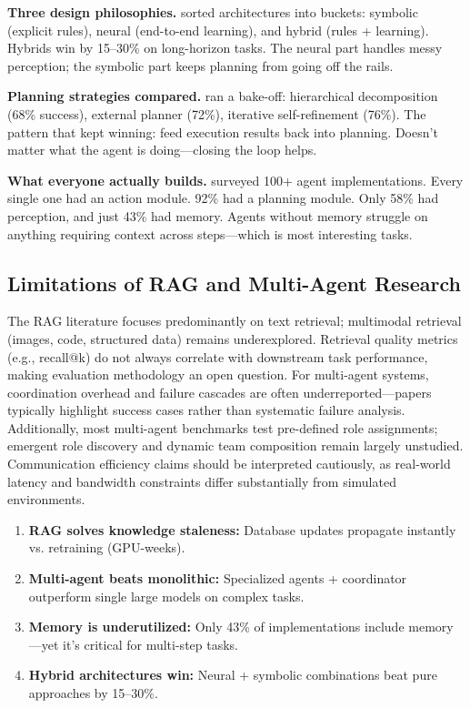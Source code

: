 \documentclass[12pt,a4paper]{report}
\theoremstyle{definition}
\begin{document}
\textbf{Three design philosophies.} \citet{sumers2023cognitive} sorted architectures into buckets: symbolic (explicit rules), neural (end-to-end learning), and hybrid (rules + learning). Hybrids win by 15--30\% on long-horizon tasks. The neural part handles messy perception; the symbolic part keeps planning from going off the rails.

\textbf{Planning strategies compared.} \citet{wang2024planning} ran a bake-off: hierarchical decomposition (68\% success), external planner (72\%), iterative self-refinement (76\%). The pattern that kept winning: feed execution results back into planning. Doesn't matter what the agent is doing---closing the loop helps.

\textbf{What everyone actually builds.} \citet{xi2023rise} surveyed 100+ agent implementations. Every single one had an action module. 92\% had a planning module. Only 58\% had perception, and just 43\% had memory. Agents without memory struggle on anything requiring context across steps---which is most interesting tasks.

\subsection{Limitations of RAG and Multi-Agent Research}
The RAG literature focuses predominantly on text retrieval; multimodal retrieval (images, code, structured data) remains underexplored. Retrieval quality metrics (e.g., recall@k) do not always correlate with downstream task performance, making evaluation methodology an open question. For multi-agent systems, coordination overhead and failure cascades are often underreported---papers typically highlight success cases rather than systematic failure analysis. Additionally, most multi-agent benchmarks test pre-defined role assignments; emergent role discovery and dynamic team composition remain largely unstudied. Communication efficiency claims should be interpreted cautiously, as real-world latency and bandwidth constraints differ substantially from simulated environments.

\begin{tcolorbox}[colback=orange!5!white, colframe=orange!60!black, title=\textbf{Chapter 4 Key Takeaways}]
\begin{enumerate}
    \item \textbf{RAG solves knowledge staleness:} Database updates propagate instantly vs. retraining (GPU-weeks).
    \item \textbf{Multi-agent beats monolithic:} Specialized agents + coordinator outperform single large models on complex tasks.
    \item \textbf{Memory is underutilized:} Only 43\% of implementations include memory---yet it's critical for multi-step tasks.
    \item \textbf{Hybrid architectures win:} Neural + symbolic combinations beat pure approaches by 15--30\%.
\end{enumerate}
\end{tcolorbox}
\end{document}
